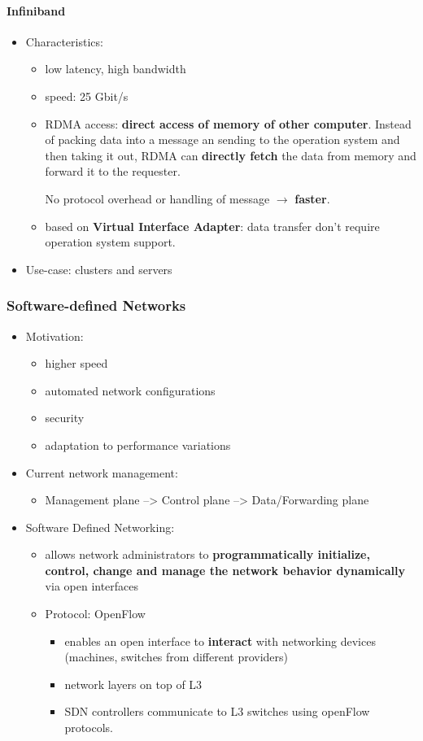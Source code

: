 \paragraph{Infiniband}
\begin{itemize}
	\item Characteristics:
	\begin{itemize}
		\item low latency, high bandwidth
		\item speed: 25 Gbit/s
		\item RDMA access: \textbf{direct access of memory of other computer}. Instead of packing data into a message an sending to the operation system and then taking it out, RDMA can \textbf{directly fetch} the data from memory and forward it to the requester. 
		
		No protocol overhead or handling of message $\rightarrow$ \textbf{faster}.
		\item based on \textbf{Virtual Interface Adapter}: data transfer don't require operation system support.
	\end{itemize}
	\item Use-case: clusters and servers
\end{itemize}

\subsubsection{Software-defined Networks}
\begin{itemize}
	\item Motivation:
	\begin{itemize}
		\item higher speed
		\item automated network configurations
		\item security
		\item adaptation to performance variations
	\end{itemize}
	\item Current network management:
	\begin{itemize}
		\item Management plane --> Control plane --> Data/Forwarding plane
	\end{itemize}
	\item Software Defined Networking:
	\begin{itemize}
		\item allows network administrators to \textbf{programmatically initialize, control, change and manage the network behavior dynamically} via open interfaces
		\item Protocol: OpenFlow
		\begin{itemize}
			\item enables an open interface to \textbf{interact} with networking devices (machines, switches from different providers)
			\item network layers on top of L3
			\item SDN controllers communicate to L3 switches using openFlow protocols. 
		\end{itemize}
	\end{itemize}

\end{itemize}


